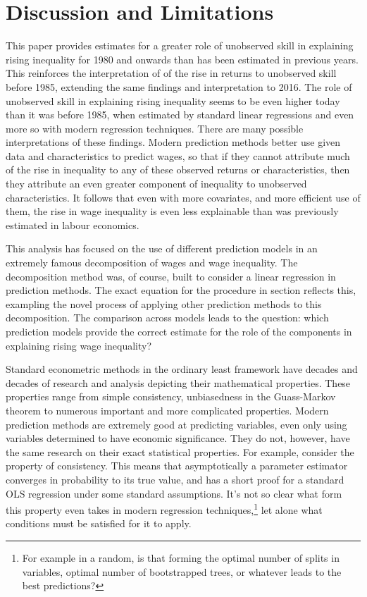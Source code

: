 \documentclass[notitlepage,12pt]{article}
\newcommand{\1}[1]{\ensuremath{\mathbb{1}\left( #1 \right)}}               %
\begin{document}
\section{Discussion and Limitations}
\label{discussion}
This paper provides estimates for a greater role of unobserved skill in explaining rising inequality for 1980 and onwards than has been estimated in previous years.  This reinforces the interpretation of \cite{juhn1993wage} of the rise in returns to unobserved skill before 1985, extending the same findings and interpretation to 2016.  The role of unobserved skill in explaining rising inequality seems to be even higher today than it was before 1985, when estimated by standard linear regressions and even more so with modern regression techniques.  There are many possible interpretations of these findings.  Modern prediction methods better use given data and characteristics to predict wages, so that if they cannot attribute much of the rise in inequality to any of these observed returns or characteristics, then they attribute an even greater component of inequality to unobserved characteristics.  It follows that even with more covariates, and more efficient use of them, the rise in wage inequality is even less explainable than was previously estimated in labour economics.

This analysis has focused on the use of different prediction models in an extremely famous decomposition of wages and wage inequality.  The decomposition method was, of course, built to consider a linear regression in prediction methods.  The exact equation for the procedure in section reflects this, exampling the novel process of applying other prediction methods to this decomposition.  The comparison across models leads to the question: which prediction models provide the correct estimate for the role of the components in explaining rising wage inequality? 


Standard econometric methods in the ordinary least framework have decades and decades of research and analysis depicting their mathematical properties.  These properties range from simple consistency, unbiasedness in the Guass-Markov theorem to numerous important and more complicated properties.  Modern prediction methods are extremely good at predicting variables, even only using variables determined to have economic significance.  They do not, however, have the same research on their exact statistical properties.  For example, consider the property of consistency.  This means that asymptotically a parameter estimator converges in probability  to its true value, and has a short proof for a standard OLS regression under some standard assumptions.  It's not so clear what form this property even takes in modern regression techniques,\footnote{For example in a random, is that forming the optimal number of splits in variables, optimal number of bootstrapped trees, or whatever leads to the best predictions?} let alone what conditions must be satisfied for it to apply.
\end{document}

